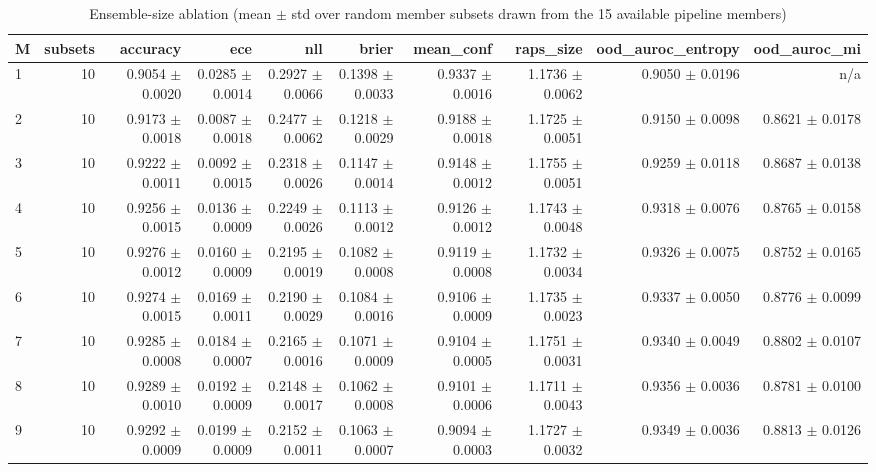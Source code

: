 \begin{table}
\centering
\caption{Ensemble-size ablation (mean $\pm$ std over random member subsets drawn from the 15 available pipeline members)}
\label{tab:de_ablation_size}
\begin{tabular}{lrrrrrrrrr}
\toprule
 M &  subsets &        accuracy &             ece &             nll &           brier &       mean\_conf &       raps\_size & ood\_auroc\_entropy &    ood\_auroc\_mi \\
\midrule
 1 &       10 & 0.9054 $\pm$ 0.0020 & 0.0285 $\pm$ 0.0014 & 0.2927 $\pm$ 0.0066 & 0.1398 $\pm$ 0.0033 & 0.9337 $\pm$ 0.0016 & 1.1736 $\pm$ 0.0062 &   0.9050 $\pm$ 0.0196 &             n/a \\
 2 &       10 & 0.9173 $\pm$ 0.0018 & 0.0087 $\pm$ 0.0018 & 0.2477 $\pm$ 0.0062 & 0.1218 $\pm$ 0.0029 & 0.9188 $\pm$ 0.0018 & 1.1725 $\pm$ 0.0051 &   0.9150 $\pm$ 0.0098 & 0.8621 $\pm$ 0.0178 \\
 3 &       10 & 0.9222 $\pm$ 0.0011 & 0.0092 $\pm$ 0.0015 & 0.2318 $\pm$ 0.0026 & 0.1147 $\pm$ 0.0014 & 0.9148 $\pm$ 0.0012 & 1.1755 $\pm$ 0.0051 &   0.9259 $\pm$ 0.0118 & 0.8687 $\pm$ 0.0138 \\
 4 &       10 & 0.9256 $\pm$ 0.0015 & 0.0136 $\pm$ 0.0009 & 0.2249 $\pm$ 0.0026 & 0.1113 $\pm$ 0.0012 & 0.9126 $\pm$ 0.0012 & 1.1743 $\pm$ 0.0048 &   0.9318 $\pm$ 0.0076 & 0.8765 $\pm$ 0.0158 \\
 5 &       10 & 0.9276 $\pm$ 0.0012 & 0.0160 $\pm$ 0.0009 & 0.2195 $\pm$ 0.0019 & 0.1082 $\pm$ 0.0008 & 0.9119 $\pm$ 0.0008 & 1.1732 $\pm$ 0.0034 &   0.9326 $\pm$ 0.0075 & 0.8752 $\pm$ 0.0165 \\
 6 &       10 & 0.9274 $\pm$ 0.0015 & 0.0169 $\pm$ 0.0011 & 0.2190 $\pm$ 0.0029 & 0.1084 $\pm$ 0.0016 & 0.9106 $\pm$ 0.0009 & 1.1735 $\pm$ 0.0023 &   0.9337 $\pm$ 0.0050 & 0.8776 $\pm$ 0.0099 \\
 7 &       10 & 0.9285 $\pm$ 0.0008 & 0.0184 $\pm$ 0.0007 & 0.2165 $\pm$ 0.0016 & 0.1071 $\pm$ 0.0009 & 0.9104 $\pm$ 0.0005 & 1.1751 $\pm$ 0.0031 &   0.9340 $\pm$ 0.0049 & 0.8802 $\pm$ 0.0107 \\
 8 &       10 & 0.9289 $\pm$ 0.0010 & 0.0192 $\pm$ 0.0009 & 0.2148 $\pm$ 0.0017 & 0.1062 $\pm$ 0.0008 & 0.9101 $\pm$ 0.0006 & 1.1711 $\pm$ 0.0043 &   0.9356 $\pm$ 0.0036 & 0.8781 $\pm$ 0.0100 \\
 9 &       10 & 0.9292 $\pm$ 0.0009 & 0.0199 $\pm$ 0.0009 & 0.2152 $\pm$ 0.0011 & 0.1063 $\pm$ 0.0007 & 0.9094 $\pm$ 0.0003 & 1.1727 $\pm$ 0.0032 &   0.9349 $\pm$ 0.0036 & 0.8813 $\pm$ 0.0126 \\

\end{tabular}
\end{table}

